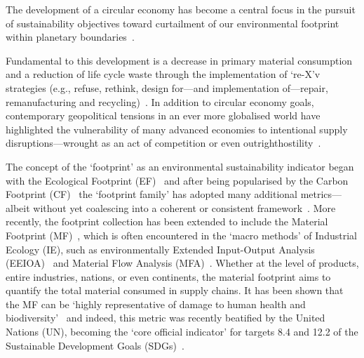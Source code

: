\documentclass[a4paper,fleqn]{cas-dc}
\begin{document}
	The development of a circular economy has become a central focus in the pursuit of sustainability objectives toward curtailment of our environmental footprint within planetary boundaries~\citep{eu2019greendeal,eu2020circ,nl2023ceplan,nl2016ceplan,pardo2018ce,ellenmacarthur2015ce}.
	
	Fundamental to this development is a decrease in primary material consumption and a reduction of life cycle waste through the implementation of `re-X'v strategies (e.g., refuse, rethink, design for---and implementation of---repair, remanufacturing and recycling)~\citep{reike2018rex, eu2022ecodesign, eu2022repair, eu2015reman}. In addition to circular economy goals, contemporary geopolitical tensions in an ever more globalised world have highlighted the vulnerability of many advanced economies to intentional supply disruptions---wrought as an act of competition or even outrighthostility~\citep{jrc2023supplychain,hartley2024cepolitics,berry2023crm}.
	
	The concept of the `footprint' as an environmental sustainability indicator began with the Ecological Footprint (EF)~\citep{wackernagel1994ecologicalfootprint} and after being popularised by the Carbon Footprint (CF)~\citep{cucek2015environmentalfootprints} the `footprint family' has adopted many additional metrics---albeit without yet
	coalescing into a coherent or consistent framework~\citep{giampietro2014footprintstonowhere,vanham2019footprints,ridoutt2013footprints}. More recently, the footprint
	collection has been extended to include the Material Footprint (MF)~\citep{weidmann2013materialfootprint}, which is often encountered in the
	`macro methods' of Industrial Ecology (IE), such as environmentally Extended Input-Output Analysis (EEIOA)~\citep{lenzen2022materialfootprint} and Material
	Flow Analysis (MFA)~\citep{schaffartzik2013mfafootprint}. Whether at the level of products, entire industries, nations, or even continents, the material
	footprint aims to quantify the total material consumed in supply chains. It has been shown that the MF can be `highly representative of damage to human health
	and biodiversity'~\citep{steinmann2017resourcefootprints} and indeed, this metric was recently beatified by the United Nations (UN), becoming the `core
	official indicator' for targets 8.4 and 12.2 of the Sustainable Development Goals (SDGs)~\citep{lenzen2022materialfootprint}.
	
\end{document}
